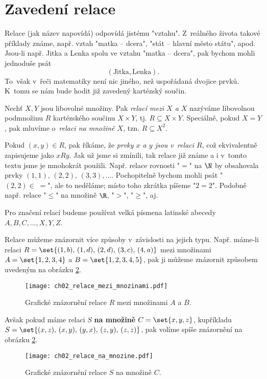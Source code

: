 \section{Zavedení relace}\label{sec:zavedeni_relace}
Relace (jak název napovídá) odpovídá jistému "vztahu". Z~reálného života takové příklady známe, např. vztah "matka -- dcera", "stát -- hlavní město státu", apod. Jsou-li např. Jitka a Lenka spolu ve vztahu "matka -- dcera", pak bychom mohli jednoduše psát
\begin{equation*}
    (\text{Jitka}, \text{Lenka}).
\end{equation*}
To~však v~řeči matematiky není nic jiného, než uspořádaná dvojice prvků. K~tomu se nám bude hodit již zavedený kartézský součin.
\begin{definition}[Relace]\label{def:relace}
    Nechť $X,Y$ jsou libovolné množiny. Pak \emph{relací mezi $X$ a $X$} nazýváme libovolnou podmnožinu $R$ kartézského součinu $X\times Y$, tj. $R\subseteq X \times Y$. Speciálně, pokud $X=Y$, pak mluvíme o~\emph{relaci na množině $X$}, tzn. $R\subseteq X^2$.
\end{definition}
Pokud $(x,y)\in R$, pak říkáme, že \emph{prvky $x$ a $y$ jsou v~relaci $R$}, což ekvivalentně zapisujeme jako $xRy$. Jak už jsme si zmínili, tak relace již známe a i v~tomto textu jsme je mnohokrát použili. Např. relace rovnosti "$=$" na $\N$ by obsahovala prvky $(1,1),\,(2,2),\,(3,3),\dots$. Pochopitelně bychom mohli psát "$(2,2)\in\;=$", ale to neděláme; místo toho zkrátka píšeme "$2=2$". Podobně např. relace "$\leq$" na množině $\R$, "$>$", "$\geq$", aj.
\begin{convention}
    Pro značení relací budeme používat velká písmena latinské abecedy $A,B,C,\dots,X,Y,Z$.
\end{convention}
Relace můžeme znázornit více způsoby v~závislosti na jejich typu. Např. máme-li relaci $R=\set{(1,b),\,(1,d),\,(2,d),\,(3,c),\,(4,a)}$ mezi množinami $A=\set{1,2,3,4}$ a $B=\set{1,2,3,4,5}$, pak ji můžeme znázornit způsobem uvedeným na obrázku \ref{fig:relace_mezi_mnozinami}.
\begin{figure}[H]
    \centering
    \texttt{[image: ch02\_relace\_mezi\_mnozinami.pdf]}
    \caption{Grafické znázornění relace $R$ mezi množinami $A$ a $B$.}
    \label{fig:relace_mezi_mnozinami}
\end{figure}
Avšak pokud máme relaci $S$ \textbf{na množině} $C=\set{x,y,z}$, kupříkladu $S=\set{(x,z),\,(x,y),\,(y,x),\,(z,y),\,(z,z)}$, pak volíme spíše znázornění na obrázku \ref{fig:relace_mezi_mnozinami}.
\begin{figure}[H]
    \centering
    \texttt{[image: ch02\_relace\_na\_mnozine.pdf]}
    \caption{Grafické znázornění relace $S$ na množině $C$.}
    \label{fig:relace_mezi_mnozinami}
\end{figure}
